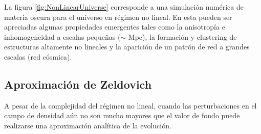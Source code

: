 La figura \ref{fig:NonLinearUniverse} corresponde a una simulación 
numérica de materia oscura para el universo en régimen no lineal. En esta 
pueden ser apreciadas algunas propiedades emergentes tales como la 
anisotropía e inhomogeneidad a escalas peque\-ñas ($\sim$ Mpc), la 
formación y clustering de estructuras altamente no lineales y la aparición 
de un patrón de red a grandes escalas (red cósmica).


	\subsection{Aproximación de Zeldovich}
	\label{subsec:Zeldovich'sApproximation}
	

A pesar de la complejidad del régimen no lineal, cuando las perturbaciones 
en el campo de densidad aún no son mucho mayores que el valor de fondo 
puede realizarse una aproximación analítica de la evolución.



